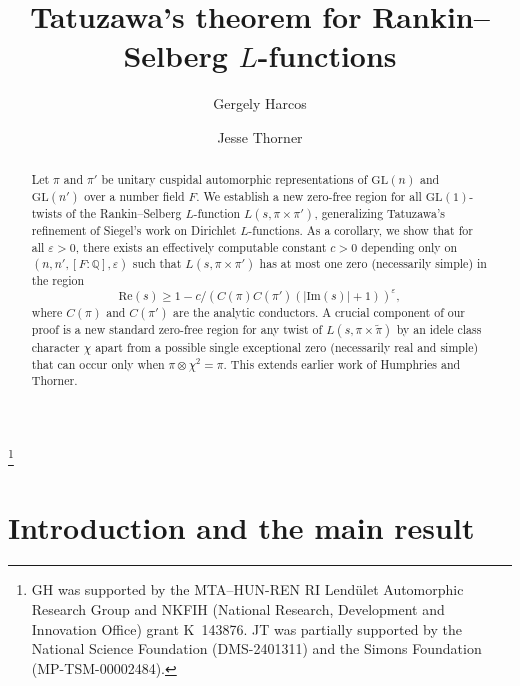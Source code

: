 \documentclass[12pt]{amsart}
\title{Tatuzawa's theorem for Rankin--Selberg $L$-functions}
\author{Gergely Harcos}
\author{Jesse Thorner}
\theoremstyle{definition}
\theoremstyle{remark}
\numberwithin{equation}{section}
\theoremstyle{plain}
\renewcommand{\tilde}{\widetilde}
\renewcommand{\epsilon}{\varepsilon}
\renewcommand{\Re}{\mathrm{Re}}
\renewcommand{\Im}{\mathrm{Im}}
\newcommand{\re}{\Re}
\newcommand{\im}{\Im}
\newcommand{\GL}{\mathrm{GL}}
\newcommand{\Q}{\mathbb{Q}}
\begin{document}
\begin{abstract}
Let $\pi$ and $\pi'$ be unitary cuspidal automorphic representations of $\GL(n)$ and $\GL(n')$ over a number field $F$. We establish a new zero-free region for all $\GL(1)$-twists of the Rankin--Selberg $L$-function $L(s,\pi\times\pi')$, generalizing Tatuzawa's refinement of Siegel's work on Dirichlet $L$-functions.  As a corollary, we show that for all $\epsilon>0$, there exists an effectively computable constant $c>0$ depending only on $(n,n',[F:\Q],\epsilon)$ such that $L(s,\pi\times\pi')$ has at most one zero (necessarily simple) in the region
\[
\re(s)\geq 1-c/(C(\pi)C(\pi')(|\im(s)|+1))^{\epsilon},
\]
where $C(\pi)$ and $C(\pi')$ are the analytic conductors.  A crucial component of our proof is a new standard zero-free region for any twist of $L(s,\pi\times\tilde{\pi})$ by an idele class character $\chi$ apart from a possible single exceptional zero (necessarily real and simple) that can occur only when $\pi\otimes\chi^2=\pi$.  This extends earlier work of Humphries and Thorner.
\end{abstract}

\thanks{GH was supported by the MTA--HUN-REN RI Lend{\"u}let Automorphic Research Group and NKFIH (National Research, Development and Innovation Office) grant K~143876. JT was partially supported by the National Science Foundation (DMS-2401311) and the Simons Foundation (MP-TSM-00002484).}


\maketitle

\section{Introduction and the main result}
\end{document}
